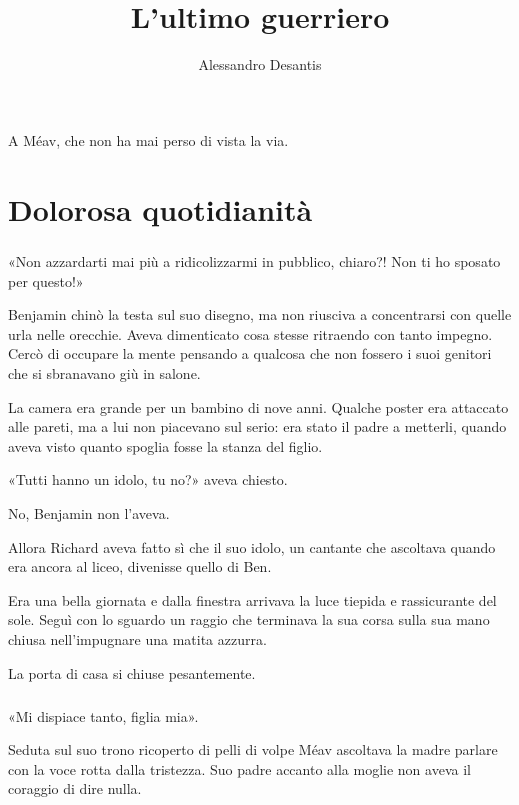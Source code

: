 \documentclass[a4paper,12pt]{book}
\title{L'ultimo guerriero}
\author{Alessandro Desantis}
\date{}
\begin{document}
\maketitle

\begin{flushright}
A Méav, che non ha mai perso di vista la via.
\end{flushright}

\chapter{Dolorosa quotidianità}

\paragraph{}
«Non azzardarti mai più a ridicolizzarmi in pubblico, chiaro?! Non ti ho
sposato per questo!»

Benjamin chinò la testa sul suo disegno, ma non riusciva a concentrarsi con
quelle urla nelle orecchie. Aveva dimenticato cosa stesse ritraendo con tanto
impegno. Cercò di occupare la mente pensando a qualcosa che non fossero i suoi
genitori che si sbranavano giù in salone.

La camera era grande per un bambino di nove anni. Qualche poster era attaccato
alle pareti, ma a lui non piacevano sul serio: era stato il padre a metterli,
quando aveva visto quanto spoglia fosse la stanza del figlio.

«Tutti hanno un idolo, tu no?» aveva chiesto.

No, Benjamin non l’aveva.

Allora Richard aveva fatto sì che il suo idolo, un cantante che ascoltava
quando era ancora al liceo, divenisse quello di Ben.

Era una bella giornata e dalla finestra arrivava la luce tiepida e rassicurante
del sole. Seguì con lo sguardo un raggio che terminava la sua corsa sulla sua
mano chiusa nell’impugnare una matita azzurra.

La porta di casa si chiuse pesantemente.

\paragraph{}
«Mi dispiace tanto, figlia mia».

Seduta sul suo trono ricoperto di pelli di volpe Méav ascoltava la madre
parlare con la voce rotta dalla tristezza. Suo padre accanto alla moglie non
aveva il coraggio di dire nulla.
\end{document}
